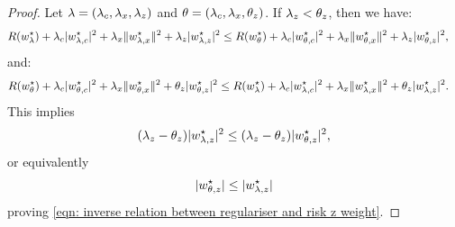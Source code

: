 \begin{proof}
    Let $\lambda = (\lambda_c,\lambda_x,\lambda_z)$ and $\theta = (\lambda_c, \lambda_x,\theta_z)$. If $\lambda_z < \theta_z$, then we have:
    \begin{equation*}
        \begin{aligned}
            &R(w^\star_{\lambda}) + \lambda_c|w^\star_{{\lambda,c}}|^2 + \lambda_x\|w^\star_{{\lambda,x}}\|^2 + \lambda_z|w^\star_{{\lambda,z}}|^2  \leq R(w^\star_{\theta}) + \lambda_c|w^\star_{\theta,c}|^2 + \lambda_x\|w^\star_{\theta,x}\|^2 + \lambda_z|w^\star_{\theta,z}|^2,
        \end{aligned}
    \end{equation*}
    and:
    \begin{equation*}
    \begin{aligned}
        &R(w^\star_{\theta}) +
        \lambda_c|w^\star_{\theta,c}|^2 +
        \lambda_x\|w^\star_{\theta,x}\|^2 +
        \theta_z|w^\star_{\theta,z}|^2
        \leq R(w^\star_{\lambda}) +
        \lambda_c|w^\star_{{\lambda,c}}|^2 +
        \lambda_x\|w^\star_{{\lambda,x}}\|^2 +
        \theta_z|w^\star_{{\lambda,z}}|^2.
    \end{aligned}
    \end{equation*}
    This implies
    \begin{equation*}
        (\lambda_z -\theta_z)|w^\star_{{\lambda,z}}|^2
        \leq (\lambda_z-\theta_z) |w^\star_{\theta,z}|^2,
    \end{equation*}
    or equivalently
    \begin{equation}\label{eqn: w theta less than w lambda}
        |w^\star_{\theta,z}| \leq |w^\star_{{\lambda,z}}|
    \end{equation}
    proving \eqref{eqn: inverse relation between regulariser and risk z weight}.


\end{proof}
